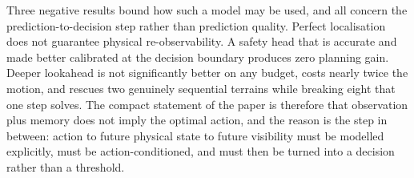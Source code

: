 \documentclass[conference]{IEEEtran}
\begin{document}
Three negative results bound how such a model may be used, and all concern the
prediction-to-decision step rather than prediction quality. Perfect localisation does
not guarantee physical re-observability. A safety head that is accurate and made
better calibrated at the decision boundary produces zero planning gain. Deeper
lookahead is not significantly better on any budget, costs nearly twice the motion,
and rescues two genuinely sequential terrains while breaking eight that one step
solves. The compact statement of the paper is therefore that observation plus memory
does not imply the optimal action, and the reason is the step in between: action to
future physical state to future visibility must be modelled explicitly, must be
action-conditioned, and must then be turned into a decision rather than a threshold.



\end{document}
